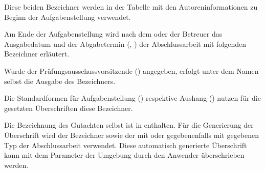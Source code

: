 \begin{Bundle*}{}
\begin{Declaration}[v2.04]{}
\begin{Declaration}{}
\printdeclarationlist%
%
Diese beiden Bezeichner werden in der Tabelle mit den Autoreninformationen zu 
Beginn der Aufgabenstellung verwendet.
\end{Declaration}
\end{Declaration}

\begin{Declaration}{}
\begin{Declaration}{}
\printdeclarationlist%
%
Am Ende der Aufgabenstellung wird nach dem oder der Betreuer das Ausgabedatum 
und der Abgabetermin (, ) der Abschlussarbeit 
mit folgenden Bezeichner erläutert.
\end{Declaration}
\end{Declaration}

\begin{Declaration}{}
\printdeclarationlist%
%
Wurde der Prüfungsausschussvorsitzende () angegeben, erfolgt 
unter dem Namen selbst die Ausgabe des Bezeichners.
\end{Declaration}

\begin{Declaration}{}
\begin{Declaration}{}
\printdeclarationlist%
%
Die Standardformen für Aufgabenstellung () respektive Aushang 
() nutzen für die gesetzten Überschriften diese Bezeichner.
\end{Declaration}
\end{Declaration}

\begin{Declaration}{}
\begin{Declaration}{}
\printdeclarationlist%
%
Die Bezeichnung des Gutachten selbst ist in  enthalten. 
Für die Generierung der Überschrift wird der Bezeichner  
sowie der mit  oder gegebenenfalls mit  gegebenen 
Typ der Abschlussarbeit verwendet. Diese automatisch generierte Überschrift 
kann mit dem Parameter  der 
Umgebung  durch den Anwender überschrieben werden.
\end{Declaration}
\end{Declaration}


\end{Bundle*}
